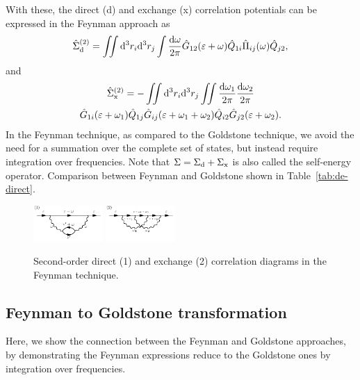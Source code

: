\documentclass[10pt,twocolumn,a4paper]{article}%
\newcommand{\be}{\begin{equation}}
\newcommand{\ee}{\end{equation}}
\def\d{\ensuremath{{\rm d}}}
\def\en{\ensuremath{\varepsilon}}
\newcommand{\w}{\ensuremath{\omega}}
\begin{document}
With these, the direct (d) and exchange (x) correlation potentials can be expressed in the Feynman approach as
\be\label{eq:FeynDir}
\hat\Sigma^{(2)}_{\rm d}
= \iint\d^3 r_i\d^3 r_j
\int\frac{\d\w}{2\pi}\hat G_{12}(\en+\w)\hat Q_{1i}\hat\Pi_{ij}(\w)\hat Q_{j2},
\ee
and
\begin{multline}\label{eq:FeynExch}
\hat\Sigma^{(2)}_{\rm x}
= -\iint\d^3 r_i\d^3 r_j
\iint\frac{\d\w_1}{2\pi}\frac{\d\w_2}{2\pi}\\
\hat G_{1i}(\en+\w_1)\hat Q_{1j} \hat G_{ij}(\en+\w_1+\w_2)\hat Q_{i2}\hat G_{j2}(\en+\w_2).
\end{multline}
In the Feynman technique, as compared to the Goldstone technique, we avoid the need for a summation over the complete set of states, but instead require integration over frequencies.
Note that $\Sigma = \Sigma_{\rm d} + \Sigma_{\rm x}$ is also called the self-energy operator.
Comparison between Feynman and Goldstone shown in Table~\ref{tab:de-direct}.





\begin{figure}%
\centering
\includegraphics[width=0.235\textwidth]{img/Sigma/Feynman_dir}
\includegraphics[width=0.235\textwidth]{img/Sigma/Feynman_exch}
\caption{\label{fig:Sigma2-Feyn}\small Second-order direct (1) and exchange (2) correlation diagrams in the Feynman technique.}
\end{figure}




\subsection{Feynman to Goldstone transformation}








Here, we show the connection between the Feynman and Goldstone approaches, by demonstrating the Feynman expressions reduce to the Goldstone ones by integration over frequencies.
\end{document}
